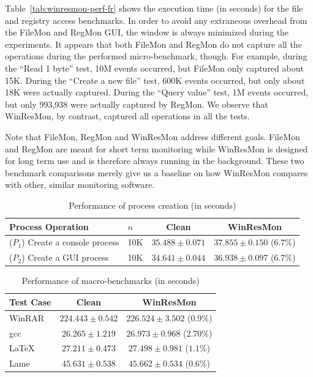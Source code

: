 Table~\ref{tab:winresmon-perf-fr} shows the execution time (in seconds)
for the file and registry access benchmarks.
In order to avoid any extraneous overhead from the FileMon and RegMon
GUI, the window is always minimized during the experiments.
It appears that both FileMon and RegMon do not capture all the operations
during the performed micro-benchmark, though.
For example, during the ``Read 1 byte'' test, 10M
events occurred, but FileMon only captured about 15K.
During the ``Create a new file'' test, 600K events occurred,
but only about 18K were actually captured.
During the ``Query value'' test, 1M events occurred, but only 993,938
were actually captured by RegMon.
We observe that WinResMon, by contrast, captured all
operations in all the tests.

Note that FileMon, RegMon and WinResMon address different goals.
FileMon and RegMon are meant for short term monitoring while WinResMon is
designed for long term use and is therefore always running in the background.
These two benchmark comparisons merely give us a baseline on how WinResMon
compares with other, similar monitoring software.

\begin{table}
\small
\centering
\begin{tabular}{|l|l|c|c|}
\hline
Process Operation & $n$ & Clean & WinResMon \\
\hline
($P_1$) Create a console process & 10K & $35.488 \pm 0.071$ & $37.855 \pm 0.150$ ($6.7\%$) \\
($P_2$) Create a GUI process     & 10K & $34.641 \pm 0.044$ & $36.938 \pm 0.097$ ($6.7\%$) \\
\hline
\end{tabular}
\caption{Performance of process creation (in seconds)}
\label{perf-proc}
\end{table}

\begin{table}
\small
\centering
\begin{tabular}{|l|c|c|}
\hline
Test Case & Clean & WinResMon \\
\hline
WinRAR   & $224.443 \pm 0.542$ & $226.524 \pm 3.502$ ($0.9\%$) \\
gcc      & $26.265 \pm 1.219$  & $26.973 \pm 0.968$ ($2.70\%$) \\
\LaTeX{} & $27.211 \pm 0.473$  & $27.498 \pm 0.981$ ($1.1\%$) \\
Lame     & $45.631 \pm 0.538$  & $45.662 \pm 0.534$ ($0.6\%$) \\
\hline
\end{tabular}
\caption{Performance of macro-benchmarks (in seconds)}
\label{perf-macro}
\end{table}


